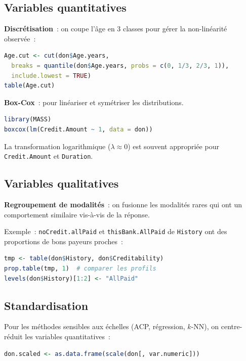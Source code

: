 \documentclass[a4paper,11pt]{article}
\theoremstyle{definition}
\theoremstyle{remark}
\begin{document}
\subsection{Variables quantitatives}

\textbf{Discrétisation}~: on coupe l'âge en 3 classes pour gérer
la non-linéarité observée~:

\begin{lstlisting}[language=R]
Age.cut <- cut(don$Age.years,
  breaks = quantile(don$Age.years, probs = c(0, 1/3, 2/3, 1)),
  include.lowest = TRUE)
table(Age.cut)
\end{lstlisting}

\textbf{Box-Cox}~: pour linéariser et symétriser les distributions.

\begin{lstlisting}[language=R]
library(MASS)
boxcox(lm(Credit.Amount ~ 1, data = don))
\end{lstlisting}

La transformation logarithmique ($\lambda \approx 0$) est souvent
appropriée pour \texttt{Credit.Amount} et \texttt{Duration}.

\subsection{Variables qualitatives}

\textbf{Regroupement de modalités}~: on fusionne les modalités rares
qui ont un comportement similaire vis-à-vis de la réponse.

Exemple~: \texttt{noCredit.allPaid} et \texttt{thisBank.AllPaid} de
\texttt{History} ont des proportions de bons payeurs proches~:

\begin{lstlisting}[language=R]
tmp <- table(don$History, don$Creditability)
prop.table(tmp, 1)  # comparer les profils
levels(don$History)[1:2] <- "AllPaid"
\end{lstlisting}

\subsection{Standardisation}

Pour les méthodes sensibles aux échelles (ACP, régression, $k$-NN),
on centre-réduit les variables quantitatives~:

\begin{lstlisting}[language=R]
don.scaled <- as.data.frame(scale(don[, var.numeric]))
\end{lstlisting}
\end{document}
